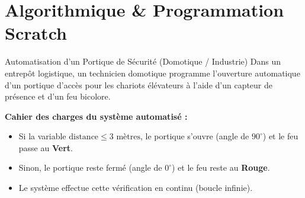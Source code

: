 \chapter{Algorithmique \& Programmation Scratch}

\begin{activite}{Automatisation d'un Portique de Sécurité (Domotique / Industrie)}
Dans un entrepôt logistique, un technicien domotique programme l'ouverture automatique d'un portique d'accès pour les chariots élévateurs à l'aide d'un capteur de présence et d'un feu bicolore.

\vspace{1mm}
\begin{center}
\begin{tcolorbox}[colback=amber!10, colframe=amber!80!black, arc=4pt, boxrule=0.8pt, left=8pt, right=8pt, top=4pt, bottom=4pt]
\sffamily\footnotesize
\textbf{Cahier des charges du système automatisé :}
\begin{itemize}[leftmargin=1.5em, itemsep=1pt]
    \item Si la variable $\text{distance} \le 3\text{ mètres}$, le portique s'ouvre (angle de $90^\circ$) et le feu passe au \textbf{Vert}.
    \item Sinon, le portique reste fermé (angle de $0^\circ$) et le feu reste au \textbf{Rouge}.
    \item Le système effectue cette vérification en continu (boucle infinie).
\end{itemize}
\end{tcolorbox}
\end{center}

\vspace{1mm}
\noindent
\begin{minipage}[c]{0.48\linewidth}
\centering
{}
\end{minipage}
\end{activite}
